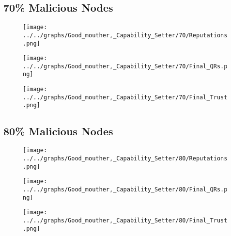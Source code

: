 \begin{minipage}[t]{0.49\columnwidth}
\subsection*{70\% Malicious Nodes}
    \begin{figure}[H]
        \centering
        \texttt{[image: ../../graphs/Good\_mouther,\_Capability\_Setter/70/Reputations.png]}
    \end{figure}
    \begin{figure}[H]
        \centering
        \texttt{[image: ../../graphs/Good\_mouther,\_Capability\_Setter/70/Final\_QRs.png]}
    \end{figure}
\end{minipage}
\begin{minipage}[t]{0.49\columnwidth}
    \begin{figure}[H]
        \centering
        \texttt{[image: ../../graphs/Good\_mouther,\_Capability\_Setter/70/Final\_Trust.png]}
    \end{figure}
\end{minipage}

\begin{minipage}[t]{0.49\columnwidth}
\subsection*{80\% Malicious Nodes}
    \begin{figure}[H]
        \centering
        \texttt{[image: ../../graphs/Good\_mouther,\_Capability\_Setter/80/Reputations.png]}
    \end{figure}
    \begin{figure}[H]
        \centering
        \texttt{[image: ../../graphs/Good\_mouther,\_Capability\_Setter/80/Final\_QRs.png]}
    \end{figure}
\end{minipage}
\begin{minipage}[t]{0.49\columnwidth}
    \begin{figure}[H]
        \centering
        \texttt{[image: ../../graphs/Good\_mouther,\_Capability\_Setter/80/Final\_Trust.png]}
    \end{figure}
\end{minipage}

